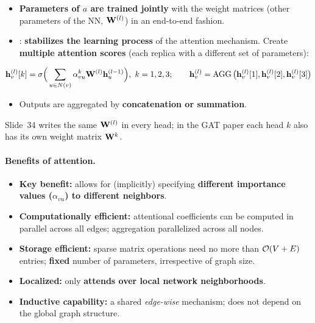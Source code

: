 \begin{itemize}
  \item \textbf{Parameters of $a$ are trained jointly} with the weight matrices
    (other parameters of the NN, $\mathbf{W}^{(l)}$) in an end-to-end fashion.
  \item {}: \textbf{stabilizes the learning process} of
    the attention mechanism. Create \textbf{multiple attention scores} (each
    replica with a different set of parameters):
\end{itemize}
\begin{equation}\label{eq:lec04-multihead}
  \mathbf{h}_v^{(l)}[k] = \sigma\Big(\sum_{u\in N(v)}\alpha_{vu}^{k}\mathbf{W}^{(l)}\mathbf{h}_u^{(l-1)}\Big),\ k=1,2,3;
  \qquad
  \mathbf{h}_v^{(l)} = \operatorname{AGG}\big(\mathbf{h}_v^{(l)}[1], \mathbf{h}_v^{(l)}[2], \mathbf{h}_v^{(l)}[3]\big)
\end{equation}
\begin{itemize}
  \item[] Outputs are aggregated by \textbf{concatenation or summation}.
\end{itemize}
\begin{caution}
  Slide~34 writes the same $\mathbf{W}^{(l)}$ in every head; in the GAT paper each head
  $k$ also has its own weight matrix $\mathbf{W}^{k}$.
\end{caution}

\paragraph{Benefits of attention.}
\begin{itemize}
  \item \textbf{Key benefit:} allows for (implicitly) specifying
    \textbf{different importance values ($\alpha_{vu}$) to different neighbors}.
  \item \textbf{Computationally efficient:} attentional coefficients can be
    computed in parallel across all edges; aggregation parallelized across all
    nodes.
  \item \textbf{Storage efficient:} sparse matrix operations need no more than
    $\mathcal{O}(V+E)$ entries; \textbf{fixed} number of parameters, irrespective of
    graph size.
  \item \textbf{Localized:} only \textbf{attends over local network
    neighborhoods}.
  \item \textbf{Inductive capability:} a shared \emph{edge-wise} mechanism; does
    not depend on the global graph structure.
\end{itemize}

